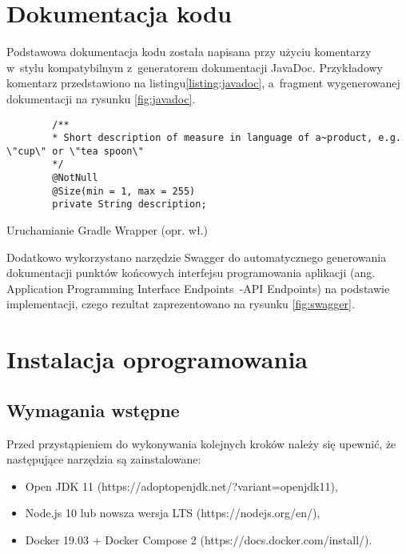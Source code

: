 \section{Dokumentacja kodu}\label{sec:code-documentation}

Podstawowa dokumentacja kodu została napisana przy użyciu komentarzy w~stylu kompatybilnym z~generatorem dokumentacji JavaDoc\cite{tech:javadoc}.
Przykładowy komentarz przedstawiono na listingu\ref{listing:javadoc}, a~fragment wygenerowanej dokumentacji na rysunku \ref{fig:javadoc}.

\begin{listing}[h!]
    \begin{verbatim}
        /**
        * Short description of measure in language of a~product, e.g. \"cup\" or \"tea spoon\"
        */
        @NotNull
        @Size(min = 1, max = 255)
        private String description;
    \end{verbatim}
    \centering\caption{Uruchamianie Gradle Wrapper (opr. wł.)}\label{listing:javadoc}
\end{listing}


Dodatkowo wykorzystano narzędzie Swagger\cite{tech:swagger} do automatycznego generowania dokumentacji
punktów końcowych interfejsu programowania aplikacji (ang. Application Programming Interface Endpoints~-API Endpoints) na podstawie implementacji,
czego rezultat zaprezentowano na rysunku \ref{fig:swagger}.


\section{Instalacja oprogramowania}\label{sec:software-installation}
\subsection{Wymagania wstępne}\label{subsec:prerequirements}
Przed przystąpieniem do wykonywania kolejnych kroków należy się upewnić, że następujące narzędzia są zainstalowane:
\begin{itemize}
    \item Open JDK 11 (https://adoptopenjdk.net/?variant=openjdk11),
    \item Node.js 10 lub nowsza wersja LTS (https://nodejs.org/en/),
    \item Docker 19.03 + Docker Compose 2 (https://docs.docker.com/install/).
\end{itemize}

